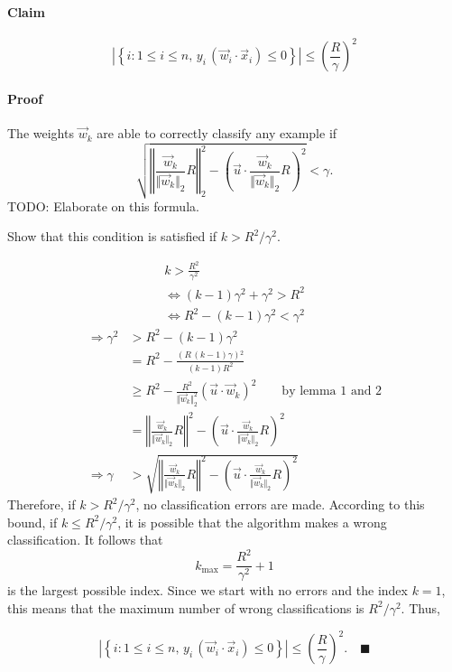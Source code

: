 \paragraph*{Claim}

\[
\left|\left\{ i:1\le i\le n,\, y_{i}\,(\vec{w}_{i}\cdot\vec{x}_{i})\leq0\right\} \right|\leq\left(\frac{R}{\gamma}\right)^{2}
\]



\paragraph*{Proof}

The weights $\vec{w}_{k}$ are able to correctly classify any example
if
\[
\sqrt{\left\Vert \frac{\vec{w}_{k}}{\Vert\vec{w}_{k}\Vert_{2}}R\right\Vert _{2}^{2}-\left(\vec{u}\cdot\frac{\vec{w}_{k}}{\Vert\vec{w}_{k}\Vert_{2}}R\right)^{2}}<\gamma.
\]
TODO: Elaborate on this formula. 

Show that this condition is satisfied if $k>R^{2}/\gamma^{2}$.

\[
\begin{gathered}k>\frac{R^{2}}{\gamma^{2}}\\
\Leftrightarrow(k-1)\gamma^{2}+\gamma^{2}>R^{2}\\
\Leftrightarrow R^{2}-(k-1)\gamma^{2}<\gamma^{2}
\end{gathered}
\]
\begin{align*}
\Rightarrow\gamma^{2} & >R^{2}-(k-1)\gamma^{2}\\
 & =R^{2}-\frac{\left(R\,\left(k-1\right)\gamma\right){}^{2}}{\left(k-1\right)R^{2}}\\
 & \geq R^{2}-\frac{R^{2}}{\Vert\vec{w}_{k}\Vert_{2}^{2}}\left(\vec{u}\cdot\vec{w}_{k}\right)^{2}\qquad\text{by lemma 1 and 2}\\
 & =\left\Vert \frac{\vec{w}_{k}}{\Vert\vec{w}_{k}\Vert_{2}}R\right\Vert ^{2}-\left(\vec{u}\cdot\frac{\vec{w}_{k}}{\Vert\vec{w}_{k}\Vert_{2}}R\right)^{2}\\
\Rightarrow\gamma & >\sqrt{\left\Vert \frac{\vec{w}_{k}}{\Vert\vec{w}_{k}\Vert_{2}}R\right\Vert ^{2}-\left(\vec{u}\cdot\frac{\vec{w}_{k}}{\Vert\vec{w}_{k}\Vert_{2}}R\right)^{2}}
\end{align*}
Therefore, if $k>R^{2}/\gamma^{2}$, no classification errors are
made. According to this bound, if $k\leq R^{2}/\gamma^{2}$, it is
possible that the algorithm makes a wrong classification. It follows
that 
\[
k_{\max}=\frac{R^{2}}{\gamma^{2}}+1
\]
 is the largest possible index. Since we start with no errors and
the index $k=1$, this means that the maximum number of wrong classifications
is $R^{2}/\gamma^{2}.$ Thus,

\[
\left|\left\{ i:1\le i\le n,\, y_{i}\,(\vec{w}_{i}\cdot\vec{x}_{i})\leq0\right\} \right|\leq\left(\frac{R}{\gamma}\right)^{2}.\quad\blacksquare
\]